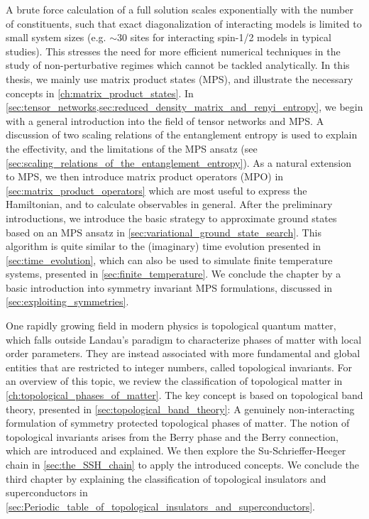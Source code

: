 A brute force calculation of a full solution scales exponentially with the number of constituents, such that exact diagonalization of interacting models is limited to small system sizes (e.g. $\sim 30$ sites for interacting spin-1/2 models in typical studies).
This stresses the need for more efficient numerical techniques in the study of non-perturbative regimes which cannot be tackled analytically.
In this thesis, we mainly use matrix product states (MPS), and illustrate the necessary concepts in \cref{ch:matrix_product_states}.
In \cref{sec:tensor_networks,sec:reduced_density_matrix_and_renyi_entropy}, we begin with a general introduction into the field of tensor networks and MPS.
A discussion of two scaling relations of the entanglement entropy is used to explain the effectivity, and the limitations of the MPS ansatz (see \cref{sec:scaling_relations_of_the_entanglement_entropy}).
As a natural extension to MPS, we then introduce matrix product operators (MPO) in \cref{sec:matrix_product_operators} which are most useful to express the Hamiltonian, and to calculate observables in general.
After the preliminary introductions, we introduce the basic strategy to approximate ground states based on an MPS ansatz in \cref{sec:variational_ground_state_search}.
This algorithm is quite similar to the (imaginary) time evolution presented in \cref{sec:time_evolution}, which can also be used to simulate finite temperature systems, presented in \cref{sec:finite_temperature}.
We conclude the chapter by a basic introduction into symmetry invariant MPS formulations, discussed in \cref{sec:exploiting_symmetries}.

One rapidly growing field in modern physics is topological quantum matter, which falls outside Landau's paradigm to characterize phases of matter with local order parameters.
They are instead associated with more fundamental and global entities that are restricted to integer numbers, called topological invariants.
For an overview of this topic, we review the classification of topological matter in \cref{ch:topological_phases_of_matter}.
The key concept is based on topological band theory, presented in \cref{sec:topological_band_theory}: A genuinely non-interacting formulation of symmetry protected topological phases of matter.
The notion of topological invariants arises from the Berry phase and the Berry connection, which are introduced and explained.
We then explore the Su-Schrieffer-Heeger chain in \cref{sec:the_SSH_chain} to apply the introduced concepts.
We conclude the third chapter by explaining the classification of topological insulators and superconductors in \cref{sec:Periodic_table_of_topological_insulators_and_superconductors}.


